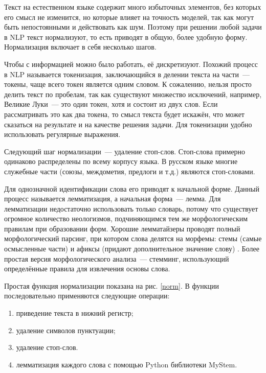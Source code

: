 \documentclass[a4paper, 14pt]{extarticle}
\begin{document}
Текст на естественном языке содержит много избыточных элементов, без которых его смысл не изменится, но которые влияет на точность моделей, так как могут быть непостоянными и действовать как шум. Поэтому при решении любой задачи в NLP текст нормализуют, то есть приводят в общую, более удобную форму. Нормализация включает в себя несколько шагов.

Чтобы с информацией можно было работать, её дискретизуют. Похожий процесс в NLP называется токенизация, заключающийся в делении текста на части~--- токены, чаще всего токен является одним словом. К сожалению, нельзя просто делить текст по пробелам, так как существуют множество исключений, например, Великие Луки~--- это один токен, хотя и состоит из двух слов. Если рассматривать это как два токена, то смысл текста будет искажён, что может сказаться на результате и на качестве решения задачи. Для токенизации удобно использовать регулярные выражения.

Следующий шаг нормализации~--- удаление стоп-слов. Стоп-слова примерно одинаково распределены по всему корпусу языка. В русском языке многие служебные части (союзы, междометия, предлоги и т.д.) являются стоп-словами.

Для однозначной идентификации слова его приводят к начальной форме. Данный процесс называется лемматизация, а начальная форма~--- лемма. Для лемматизации недостаточно использовать только словарь, потому что существует огромное количество неологизмов, подчиняющимся тем же морфологическим правилам при образовании форм. Хорошие лемматайзеры проводят полный морфологический парсинг, при котором слова делятся на морфемы: стемы (самые осмысленные части) и афиксы (придают дополнительное значение слову) \cite{c2}. Более простая версия морфологического анализа~--- стемминг, использующий определённые правила для извлечения основы слова.


Простая функция нормализации показана на рис. \ref{norm}. В функции последовательно применяются следующие операции:
\begin{enumerate}
	\item приведение текста в нижний регистр;
	\item удаление символов пунктуации;
	\item удаление стоп-слов.
	\item лемматизация каждого слова с помощью Python библиотеки MyStem.
\end{enumerate}
\end{document}
